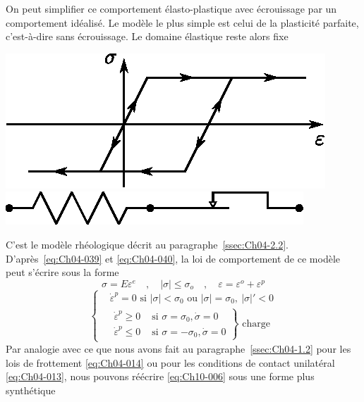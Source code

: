 On peut simplifier ce comportement élasto-plastique avec écrouissage par un 	comportement idéalisé.
Le modèle le plus simple est celui de la plasticité parfaite, c'est-à-dire sans écrouissage.
Le domaine élastique reste alors fixe
\begin{multicols}{2}
    \centering
    \includegraphics{../images/T1_Ch10-03.eps}
    \columnbreak
    \includegraphics{../images/T1_Ch10-04.eps}
\end{multicols}
C'est le modèle rhéologique décrit au paragraphe~\ref{ssec:Ch04-2.2}.
D'après~\eqref{eq:Ch04-039} et \eqref{eq:Ch04-040}, la loi de comportement de ce modèle peut s'écrire sous la forme 
\begin{equation}
    \sigma = E \varepsilon^e \quad, \quad |\sigma| \leq \sigma_o \quad, \quad \varepsilon = \varepsilon^o + \varepsilon^p 
    \label{eq:Ch10-005}
\end{equation}
\begin{equation}
    \left\{
    \begin{aligned}
        &\dot{\varepsilon}^p = 0  \text{ si } |\sigma| < \sigma_0 \text{ ou } |\sigma| = \sigma_0, \ |\sigma|' < 0 \\
        &\left.
        \begin{aligned}
            \dot{\varepsilon}^p \geq 0 & \text{ si } \sigma = \sigma_0, \dot{\sigma} = 0 \\
            \dot{\varepsilon}^p \leq 0 & \text{ si } \sigma = - \sigma_0, \dot{\sigma} = 0
        \end{aligned}
        \right\} \text{ charge}
    \end{aligned}
    \right.
    \label{eq:Ch10-006}
\end{equation}
Par analogie avec ce que nous avons fait au paragraphe~\ref{ssec:Ch04-1.2} pour les lois de frottement \eqref{eq:Ch04-014} ou pour les conditions de contact unilatéral \eqref{eq:Ch04-013}, nous pouvons réécrire \eqref{eq:Ch10-006} sous une forme plus synthétique 
